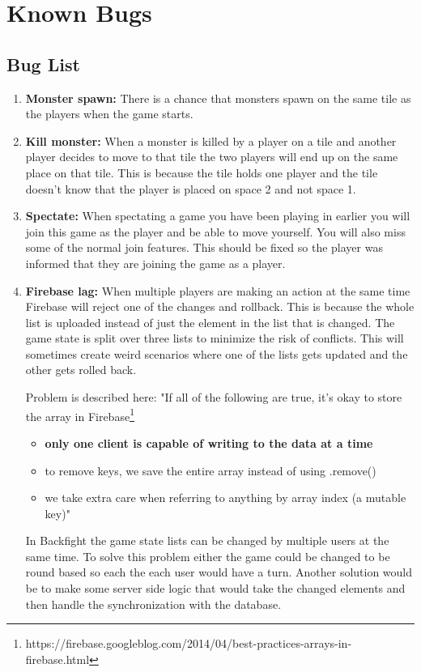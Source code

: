 \pagestyle{Uni}

\chapter{Known Bugs}
\label{ch:knownBugs}

\section{Bug List}

\begin{enumerate}
	\item \textbf{Monster spawn:} There is a chance that monsters spawn on the same tile as the players when the game starts.
	
	\item \textbf{Kill monster:} When a monster is killed by a player on a tile and another player decides to move to that tile the two players will end up on the same place on that tile. This is because the tile holds one player and the tile doesn't know that the player is placed on space 2 and not space 1.
		
	\item \textbf{Spectate:} When spectating a game you have been playing in earlier you will join this game as the player and be able to move yourself. You will also miss some of the normal join features. This should be fixed so the player was informed that they are joining the game as a player.

	\item \textbf{Firebase lag:} When multiple players are making an action at the same time Firebase will reject one of the changes and rollback. This is because the whole list is uploaded instead of just the element in the list that is changed. The game state is split over three lists to minimize the risk of conflicts. This will sometimes create weird scenarios where one of the lists gets updated and the other gets rolled back.
	
	Problem is described here: "If all of the following are true, it's okay to store the array in Firebase\footnote{https://firebase.googleblog.com/2014/04/best-practices-arrays-in-firebase.html}
	
	\begin{itemize}
		\item \textbf{only one client is capable of writing to the data at a time}
		\item to remove keys, we save the entire array instead of using .remove()
		\item we take extra care when referring to anything by array index (a mutable key)"
	\end{itemize}
	In Backfight the game state lists can be changed by multiple users at the same time. To solve this problem either the game could be changed to be round based so each the each user would have a turn. Another solution would be to make some server side logic that would take the changed elements and then handle the synchronization with the database.
	

\end{enumerate}
